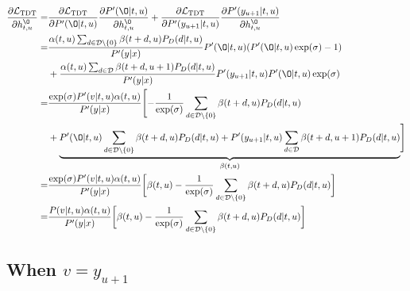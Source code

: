 \documentclass{article}
\begin{document}
\begin{equation} \label{under_norm_2}
\begin{aligned}
 \frac{\partial{\mathcal{L}_\text{TDT}}}{\partial{h_{t, u}^{\O}}} = & \frac{\partial{\mathcal{L}_\text{TDT}}}{\partial{P'(\O| t, u)}} \frac{\partial{P'(\O| t, u)}}{\partial{h_{t, u}^{\O}}} + \frac{\partial{\mathcal{L}_\text{TDT}}}{\partial{P'(y_{u+1}| t, u)}} \frac{\partial{P'(y_{u+1}| t, u)}}{\partial{h_{t, u}^{\O}}} \\
=  & \frac{\alpha(t, u) \sum_{d \in \mathcal{D} \setminus \{0\}} {\beta(t + d,u) P_D(d|t, u)}} {P'(y|x)} P'(\O| t, u)(P'(\O| t, u) \exp(\sigma) - 1)\\
 & + \frac{\alpha(t, u) \sum_{d \in \mathcal{D}}                 {\beta(t + d,u+1)P_D(d|t,u)}} {P'(y|x)} P'(y_{u+1}| t, u) P'(\O|t, u) \exp(\sigma) \\
 = & \frac{\exp(\sigma) P'(v|t, u) \alpha(t, u)}{P'(y|x)} \Biggl[ - \frac{1}{\exp(\sigma)} \sum_{d \in \mathcal{D} \setminus \{0\}} {\beta(t + d,u) P_D(d|t, u)}\\
 & + \underbrace{ P'(\O|t, u)  \sum_{d \in \mathcal{D} \setminus \{0\}} {\beta(t + d,u) P_D(d|t, u)} + P'(y_{u+1}|t, u)  \sum_{d \in \mathcal{D}}                 {\beta(t + d,u+1)P_D(d|t,u)} }_{\beta(t,u)}  \Biggr] \\
 = & \frac{\exp(\sigma) P'(v|t, u) \alpha(t, u) }{P'(y|x)} \bigg[ \beta(t,u) -\frac{1}{\exp(\sigma)}  \sum_{d \in \mathcal{D} \setminus \{0\}} {\beta(t + d,u) P_D(d|t, u)} \bigg] \\
 = & \frac{P(v|t, u) \alpha(t, u)}{P'(y|x)} \bigg[ \beta(t,u) - \frac{1}{\exp(\sigma)}  \sum_{d \in \mathcal{D} \setminus \{0\}} {\beta(t + d,u) P_D(d|t, u)} \bigg] \\
\end{aligned}
\end{equation}

\subsection{When $v = y_{u+1}$}
\end{document}
